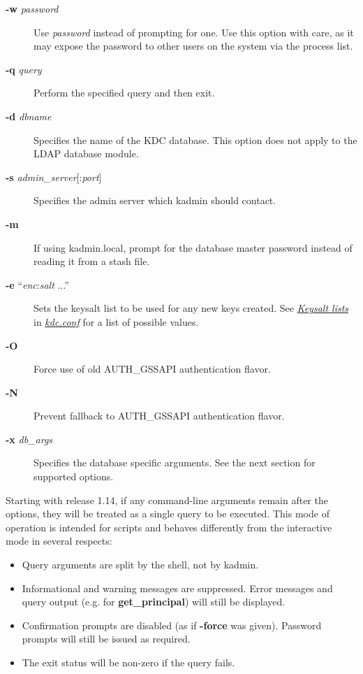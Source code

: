\documentclass[letterpaper,10pt,english]{sphinxmanual}
\begin{document}
\begin{description}
\item[{\textbf{-w} \emph{password}}] \leavevmode
Use \emph{password} instead of prompting for one.  Use this option with
care, as it may expose the password to other users on the system
via the process list.

\item[{\textbf{-q} \emph{query}}] \leavevmode
Perform the specified query and then exit.

\item[{\textbf{-d} \emph{dbname}}] \leavevmode
Specifies the name of the KDC database.  This option does not
apply to the LDAP database module.

\item[{\textbf{-s} \emph{admin\_server}{[}:\emph{port}{]}}] \leavevmode
Specifies the admin server which kadmin should contact.

\item[{\textbf{-m}}] \leavevmode
If using kadmin.local, prompt for the database master password
instead of reading it from a stash file.

\item[{\textbf{-e} ``\emph{enc}:\emph{salt} ...''}] \leavevmode
Sets the keysalt list to be used for any new keys created.  See
{\hyperref[admin/conf_files/kdc_conf:keysalt-lists]{\emph{Keysalt lists}}} in {\hyperref[admin/conf_files/kdc_conf:kdc-conf-5]{\emph{kdc.conf}}} for a list of possible
values.

\item[{\textbf{-O}}] \leavevmode
Force use of old AUTH\_GSSAPI authentication flavor.

\item[{\textbf{-N}}] \leavevmode
Prevent fallback to AUTH\_GSSAPI authentication flavor.

\item[{\textbf{-x} \emph{db\_args}}] \leavevmode
Specifies the database specific arguments.  See the next section
for supported options.

\end{description}
\label{admin/admin_commands/kadmin_local:kadmin-options-end}
Starting with release 1.14, if any command-line arguments remain after
the options, they will be treated as a single query to be executed.
This mode of operation is intended for scripts and behaves differently
from the interactive mode in several respects:
\begin{itemize}
\item {} 
Query arguments are split by the shell, not by kadmin.

\item {} 
Informational and warning messages are suppressed.  Error messages
and query output (e.g. for \textbf{get\_principal}) will still be
displayed.

\item {} 
Confirmation prompts are disabled (as if \textbf{-force} was given).
Password prompts will still be issued as required.

\item {} 
The exit status will be non-zero if the query fails.

\end{itemize}
\end{document}

